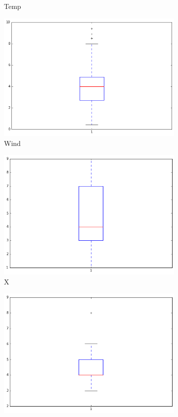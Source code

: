 \begin{figure}[!ht]
\begin{subfigure}[b]{.45\linewidth}
\caption{Temp}\label{fig:gull}
\end{subfigure}
\begin{subfigure}[b]{.45\linewidth}
\includegraphics[width=\linewidth]{fig/boxplots/wind.png}
\caption{Wind}\label{fig:tiger}
\end{subfigure}
\begin{subfigure}[b]{.45\linewidth}
\includegraphics[width=\linewidth]{fig/boxplots/x.png}
\caption{X}\label{fig:tiger}
\end{subfigure}
\begin{subfigure}[b]{.45\linewidth}
\includegraphics[width=\linewidth]{fig/boxplots/y.png}

\end{subfigure}
\end{figure}
